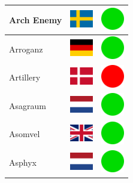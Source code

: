 \documentclass[12pt, a4paper, twoside]{report}
\begin{document}
\begin{center}
\begin{longtable}{|p{5cm}|p{2cm}|p{2cm}|}
			Arch Enemy & \includegraphics[width=1cm]{4x3/se} & \includegraphics[width=1cm]{likes/y} \\ \hline
			Arroganz & \includegraphics[width=1cm]{4x3/de} & \includegraphics[width=1cm]{likes/y} \\ \hline
			Artillery & \includegraphics[width=1cm]{4x3/dk} & \includegraphics[width=1cm]{likes/n} \\ \hline
			Asagraum & \includegraphics[width=1cm]{4x3/nl} & \includegraphics[width=1cm]{likes/y} \\ \hline
			Asomvel & \includegraphics[width=1cm]{4x3/gb} & \includegraphics[width=1cm]{likes/y} \\ \hline
			Asphyx & \includegraphics[width=1cm]{4x3/nl} & \includegraphics[width=1cm]{likes/y} \\ \hline

\end{longtable}
\end{center}
\end{document}
